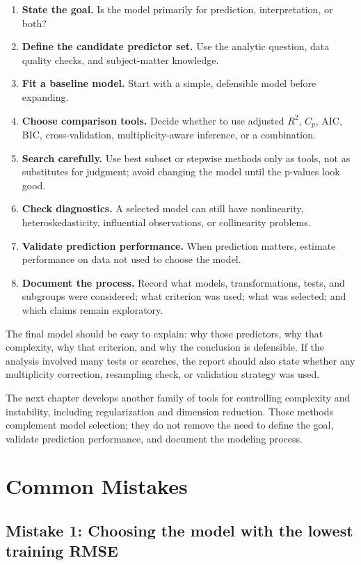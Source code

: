 \begin{enumerate}
  \item \textbf{State the goal.}  Is the model primarily for prediction, interpretation, or both?
  \item \textbf{Define the candidate predictor set.}  Use the analytic question, data quality checks, and subject-matter knowledge.
  \item \textbf{Fit a baseline model.}  Start with a simple, defensible model before expanding.
  \item \textbf{Choose comparison tools.}  Decide whether to use adjusted \(R^2\), \(C_p\), AIC, BIC, cross-validation, multiplicity-aware inference, or a combination.
  \item \textbf{Search carefully.}  Use best subset or stepwise methods only as tools, not as substitutes for judgment; avoid changing the model until the p-values look good.
  \item \textbf{Check diagnostics.}  A selected model can still have nonlinearity, heteroskedasticity, influential observations, or collinearity problems.
  \item \textbf{Validate prediction performance.}  When prediction matters, estimate performance on data not used to choose the model.
  \item \textbf{Document the process.}  Record what models, transformations, tests, and subgroups were considered; what criterion was used; what was selected; and which claims remain exploratory.
\end{enumerate}

The final model should be easy to explain: why those predictors, why that complexity, why that criterion, and why the conclusion is defensible.  If the analysis involved many tests or searches, the report should also state whether any multiplicity correction, resampling check, or validation strategy was used.

The next chapter develops another family of tools for controlling complexity and instability, including regularization and dimension reduction.  Those methods complement model selection; they do not remove the need to define the goal, validate prediction performance, and document the modeling process.

\section{Common Mistakes}

\subsection*{Mistake 1: Choosing the model with the lowest training RMSE}

